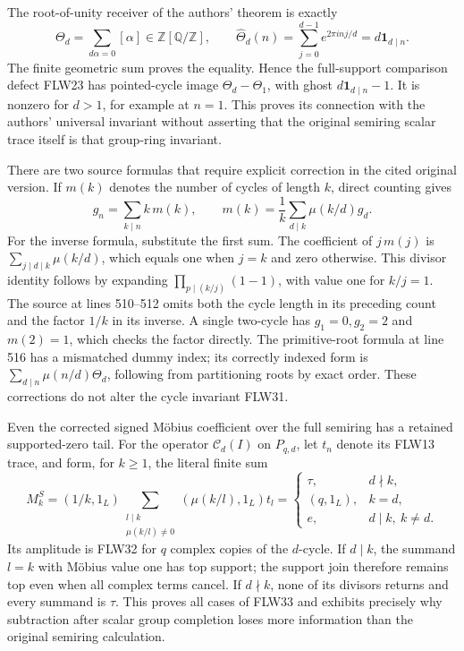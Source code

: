The root-of-unity receiver of the authors' theorem is exactly
\[
 \Theta_d=\sum_{d\alpha=0}[\alpha]\in\mathbb Z[\mathbb Q/\mathbb Z],
 \qquad
 \widehat\Theta_d(n)=\sum_{j=0}^{d-1}e^{2\pi i nj/d}
                   =d\mathbf1_{d\mid n}.
 \tag{FLW31}
\]
The finite geometric sum proves the equality. Hence the full-support
comparison defect FLW23 has pointed-cycle image
$\Theta_d-\Theta_1$, with ghost $d\mathbf1_{d\mid n}-1$.
It is nonzero for $d>1$, for example at $n=1$.
This proves its connection with the authors' universal invariant
without asserting that the original semiring scalar trace itself
is that group-ring invariant.

There are two source formulas that require explicit correction in
the cited original version. If $m(k)$ denotes the number of cycles
of length $k$, direct counting gives
\[
 g_n=\sum_{k\mid n}k\,m(k),\qquad
 m(k)=\frac1k\sum_{d\mid k}\mu(k/d)g_d.
 \tag{FLW32}
\]
For the inverse formula, substitute the first sum. The coefficient
of $j\,m(j)$ is $\sum_{j\mid d\mid k}\mu(k/d)$, which equals one
when $j=k$ and zero otherwise. This divisor identity follows by
expanding $\prod_{p\mid(k/j)}(1-1)$, with value one for $k/j=1$.
The source at lines 510--512 omits both the cycle length in its
preceding count and the factor $1/k$ in its inverse. A single
two-cycle has $g_1=0,g_2=2$ and $m(2)=1$, which checks the factor
directly. The primitive-root formula at line 516 has a mismatched
dummy index; its correctly indexed form is
$\sum_{d\mid n}\mu(n/d)\Theta_d$, following from partitioning
roots by exact order. These corrections do not alter the cycle
invariant FLW31.

Even the corrected signed M\"obius coefficient over the full
semiring has a retained supported-zero tail. For the operator
$\mathcal C_d(I)$ on $P_{q,d}$, let $t_n$ denote its FLW13 trace,
and form, for $k\ge1$, the literal finite sum
\[
 M_k^S=(1/k,1_L)\sum_{\substack{l\mid k\\\mu(k/l)\ne0}}
                  (\mu(k/l),1_L)t_l
 =\begin{cases}
 \tau,&d\nmid k,\\
 (q,1_L),&k=d,\\
 e,&d\mid k,\ k\ne d.
 \end{cases}
 \tag{FLW33}
\]
Its amplitude is FLW32 for $q$ complex copies of the $d$-cycle.
If $d\mid k$, the summand $l=k$ with M\"obius value one has
top support; the support join therefore remains top even when all
complex terms cancel. If $d\nmid k$, none of its divisors returns
and every summand is $\tau$. This proves all cases of FLW33 and
exhibits precisely why subtraction after scalar group completion
loses more information than the original semiring calculation.

